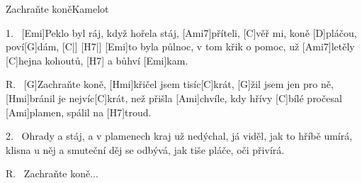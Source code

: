%
%
%
%
%
%
%
%
%

\begin{song}{Zachraňte koně}{Kamelot}

\begin{xverse}{1.~}
[\large Emi]Peklo byl ráj, když hořela stáj, [\large Ami7]příteli,
[\large C]věř mi, koně [\large D]pláčou, poví[\large G]dám, [\large C|]{} [\large H7|]{}
[\large Emi]to byla půlnoc, v tom křik o pomoc, už [\large Ami7]letěly
[\large C]hejna kohoutů, [\large H7]{} a bůhví [\large Emi]kam.
\end{xverse}

\begin{xverse}{R.~}
[\large G]Zachraňte koně, [\large Hmi]křičel jsem tisíc[\large C]krát,
[\large G]{žil} jsem jen pro ně, [\large Hmi]bránil je nejvíc[\large C]krát,
než přišla [\large Ami]chvíle, kdy hřívy [\large C]bílé
pročesal [\large Ami]plamen, spálil na [\large H7]troud.
\end{xverse}

\begin{xverse}{2.~}
Ohrady a stáj, a v plamenech kraj už nedýchal,
já viděl, jak to hříbě umírá,
klisna u něj a smuteční děj se odbývá,
jak tiše pláče, oči přivírá.
\end{xverse}

\begin{xverse}{R.~}
Zachraňte koně...
\end{xverse}

\end{song}
\chords{ \chordAmiSeven }

